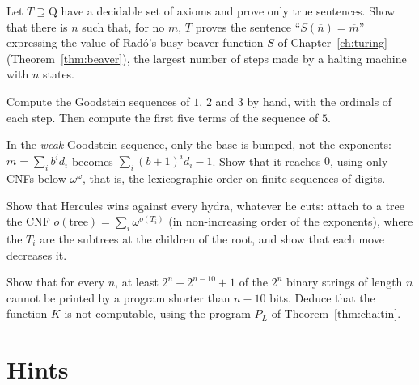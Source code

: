 \begin{exercise}[$\star\star$]\label{ex:beaver}
Let $T\supseteq\mathrm Q$ have a decidable set of axioms and prove only true sentences. Show that there is $n$ such that, for no $m$, $T$ proves the sentence ``$S(\overline n)=\overline m$'' expressing the value of Radó's busy beaver function $S$ of Chapter~\ref{ch:turing} (Theorem~\ref{thm:beaver}), the largest number of steps made by a halting machine with $n$ states.
\end{exercise}

\begin{exercise}[$\star$]\label{ex:goodsteinsmall}
Compute the Goodstein sequences of $1$, $2$ and $3$ by hand, with the ordinals of each step. Then compute the first five terms of the sequence of $5$.
\end{exercise}

\begin{exercise}[$\star\star$]\label{ex:weakgoodstein}
In the \emph{weak} Goodstein sequence, only the base is bumped, not the exponents: $m=\sum_ib^id_i$ becomes $\sum_i(b+1)^id_i-1$. Show that it reaches $0$, using only CNFs below $\omega^\omega$, that is, the lexicographic order on finite sequences of digits.
\end{exercise}

\begin{exercise}[$\star\star\star$]\label{ex:hydra}
Show that Hercules wins against every hydra, whatever he cuts: attach to a tree the CNF $o(\text{tree})=\sum_i\omega^{o(T_i)}$ (in non-increasing order of the exponents), where the $T_i$ are the subtrees at the children of the root, and show that each move decreases it.
\end{exercise}

\begin{exercise}[$\star$]\label{ex:kolmogorov}
Show that for every $n$, at least $2^n-2^{n-10}+1$ of the $2^n$ binary strings of length $n$ cannot be printed by a program shorter than $n-10$ bits. Deduce that the function $K$ is not computable, using the program $P_L$ of Theorem~\ref{thm:chaitin}.
\end{exercise}

\section{Hints}

